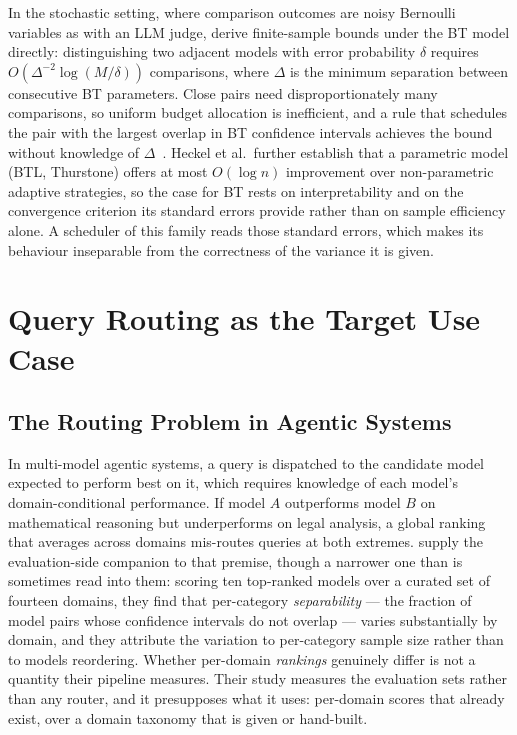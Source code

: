 In the stochastic setting, where comparison outcomes are noisy
Bernoulli variables as with an LLM judge,
\textcite{heckel2019activeranking} derive finite-sample bounds under
the BT model directly: distinguishing two adjacent models with error
probability $\delta$ requires $O(\Delta^{-2} \log(M/\delta))$
comparisons, where $\Delta$ is the minimum separation between
consecutive BT parameters. Close pairs need disproportionately many
comparisons, so uniform budget allocation is inefficient, and a rule
that schedules the pair with the largest overlap in BT confidence
intervals achieves the bound without knowledge of
$\Delta$~\parencite{heckel2019activeranking}. Heckel et al.\ further
establish that a parametric model (BTL, Thurstone) offers at most
$O(\log n)$ improvement over non-parametric adaptive strategies, so
the case for BT rests on interpretability and on the convergence
criterion its standard errors provide rather than on sample
efficiency alone. A scheduler of this family reads those standard
errors, which makes its behaviour inseparable from the correctness of
the variance it is given.

\section{Query Routing as the Target Use Case}\label{sec:routing}

\subsection*{The Routing Problem in Agentic Systems}

In multi-model agentic systems, a query is dispatched to the
candidate model expected to perform best on it, which requires
knowledge of each model's domain-conditional performance. If model
$A$ outperforms model $B$ on mathematical reasoning but underperforms
on legal analysis, a global ranking that averages across domains
mis-routes queries at both extremes.
\textcite{raju2024constructing} supply the evaluation-side companion
to that premise, though a narrower one than is sometimes read into
them: scoring ten top-ranked models over a curated set of fourteen
domains, they find that per-category \emph{separability} --- the
fraction of model pairs whose confidence intervals do not overlap ---
varies substantially by domain, and they attribute the variation to
per-category sample size rather than to models reordering. Whether
per-domain \emph{rankings} genuinely differ is not a quantity their
pipeline measures. Their study measures the evaluation sets rather
than any router, and it presupposes what it uses: per-domain scores
that already exist, over a domain taxonomy that is given or
hand-built.

